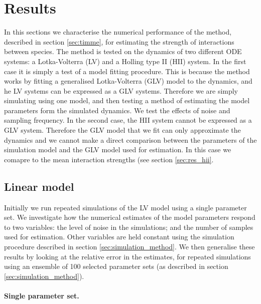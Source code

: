 \section{Results}
\label{sec:results}

In this sections we characterise the numerical performance of the method, described in section \ref{sec:timme}, for estimating the strength of interactions between species. The method is tested on the dynamics of two different ODE systems: a Lotka-Volterra (LV) and a Holling type II (HII) system. In the first case it is simply a test of a model fitting procedure. This is because the method works by fitting a generalised Lotka-Volterra (GLV) model to the dynamics, and he LV systems can be expressed as a GLV systems. Therefore we are simply simulating using one model, and then testing a method of estimating the model parameters form the simulated dynamics. We test the effects of noise and sampling frequency. In the second case, the HII system cannot be expressed as a GLV system. Therefore the GLV model that we fit can only approximate the dynamics and we cannot make a direct comparison between the parameters of the simulation model and the GLV model used for estimation. In this case we comapre to the mean interaction strengths (see section \ref{sec:res_hii}.


\subsection{Linear model}
\label{sec:res_glv}

Initially we run repeated simulations of the LV model using a single parameter set. We investigate how the numerical estimates of the model parameters respond to two variables: the level of noise in the simulations; and the number of samples used for estimation. Other variables are held constant using the simulation procedure described in section \ref{sec:simulation_method}. We then generalise these results by looking at the relative error in the estimates, for repeated simulations using an ensemble of 100 selected parameter sets (as described in section \ref{sec:simulation_method}).

\paragraph*{Single parameter set.}

